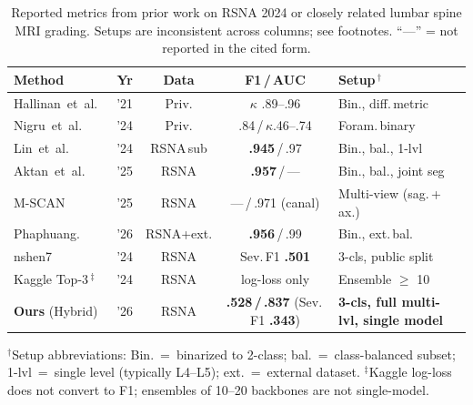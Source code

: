 \documentclass[conference]{IEEEtran}
\newcommand{\best}[1]{\textcolor{best}{\textbf{#1}}}
\begin{document}
\begin{table}[t]
\centering
\caption{Reported metrics from prior work on RSNA 2024 or closely
related lumbar spine MRI grading. Setups are inconsistent across
columns; see footnotes. ``—'' = not reported in the cited form.}
\label{tab:sota}
\renewcommand{\arraystretch}{1.05}
\setlength{\tabcolsep}{4pt}
\footnotesize
\begin{tabular}{@{}lcccl@{}}
\toprule
Method & Yr & Data & F1\,/\,AUC & Setup\,$^\dagger$ \\
\midrule
Hallinan~et~al.~\cite{hallinan2021}      & '21 & Priv.   & $\kappa$ .89--.96 & Bin., diff.\,metric \\
Nigru~et~al.~\cite{nigru2024}            & '24 & Priv.   & .84\,/\,$\kappa$.46--.74 & Foram.\,binary \\
Lin~et~al.~\cite{lin2024cbam}            & '24 & RSNA\,sub & \best{.945}\,/\,.97 & Bin., bal., 1-lvl \\
Aktan~et~al.~\cite{aktan2025}            & '25 & RSNA    & \best{.957}\,/\,—   & Bin., bal., joint seg \\
M-SCAN~\cite{hong2025mscan}              & '25 & RSNA    & —\,/\,.971 (canal) & Multi-view (sag.\,+\,ax.) \\
Phaphuang.~\cite{phaphuangwittayakul2026}& '26 & RSNA+ext. & \best{.956}\,/\,.99 & Bin., ext.\,bal. \\
nshen7~\cite{nshen2024}                  & '24 & RSNA & Sev.\,F1 \best{.501} & 3-cls, public split \\
Kaggle Top-3\,$^\ddagger$ \cite{kaggle2024} & '24 & RSNA & log-loss only & Ensemble $\geq$ 10 \\
\midrule
\textbf{Ours} (Hybrid)                   & '26 & RSNA    & \textbf{.528\,/\,.837} (Sev.\,F1 \textbf{.343}) & \textbf{3-cls, full multi-lvl, single model} \\
\bottomrule
\end{tabular}

\vspace{2pt}
\par
{\raggedright\scriptsize
$^\dagger$Setup abbreviations: Bin.~=~binarized to 2-class;
bal.~=~class-balanced subset; 1-lvl~=~single level (typically L4--L5);
ext.~=~external dataset. $^\ddagger$Kaggle log-loss does not convert
to F1; ensembles of 10--20 backbones are not single-model.\par}
\end{table}


\end{document}
